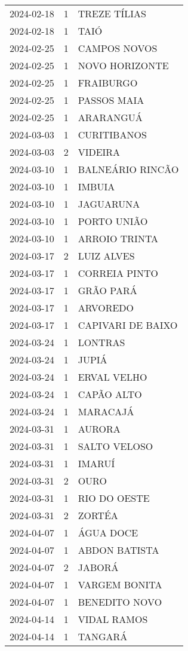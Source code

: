 \begin{longtable}[htbp]{ccl}
2024-02-18 & 1 & TREZE TÍLIAS \\
2024-02-18 & 1 & TAIÓ \\
2024-02-25 & 1 & CAMPOS NOVOS \\
2024-02-25 & 1 & NOVO HORIZONTE \\
2024-02-25 & 1 & FRAIBURGO \\
2024-02-25 & 1 & PASSOS MAIA \\
2024-02-25 & 1 & ARARANGUÁ \\
2024-03-03 & 1 & CURITIBANOS \\
2024-03-03 & 2 & VIDEIRA \\
2024-03-10 & 1 & BALNEÁRIO RINCÃO \\
2024-03-10 & 1 & IMBUIA \\
2024-03-10 & 1 & JAGUARUNA \\
2024-03-10 & 1 & PORTO UNIÃO \\
2024-03-10 & 1 & ARROIO TRINTA \\
2024-03-17 & 2 & LUIZ ALVES \\
2024-03-17 & 1 & CORREIA PINTO \\
2024-03-17 & 1 & GRÃO PARÁ \\
2024-03-17 & 1 & ARVOREDO \\
2024-03-17 & 1 & CAPIVARI DE BAIXO \\
2024-03-24 & 1 & LONTRAS \\
2024-03-24 & 1 & JUPIÁ \\
2024-03-24 & 1 & ERVAL VELHO \\
2024-03-24 & 1 & CAPÃO ALTO \\
2024-03-24 & 1 & MARACAJÁ \\
2024-03-31 & 1 & AURORA \\
2024-03-31 & 1 & SALTO VELOSO \\
2024-03-31 & 1 & IMARUÍ \\
2024-03-31 & 2 & OURO \\
2024-03-31 & 1 & RIO DO OESTE \\
2024-03-31 & 2 & ZORTÉA \\
2024-04-07 & 1 & ÁGUA DOCE \\
2024-04-07 & 1 & ABDON BATISTA \\
2024-04-07 & 2 & JABORÁ \\
2024-04-07 & 1 & VARGEM BONITA \\
2024-04-07 & 1 & BENEDITO NOVO \\
2024-04-14 & 1 & VIDAL RAMOS \\
2024-04-14 & 1 & TANGARÁ \\

\end{longtable}
